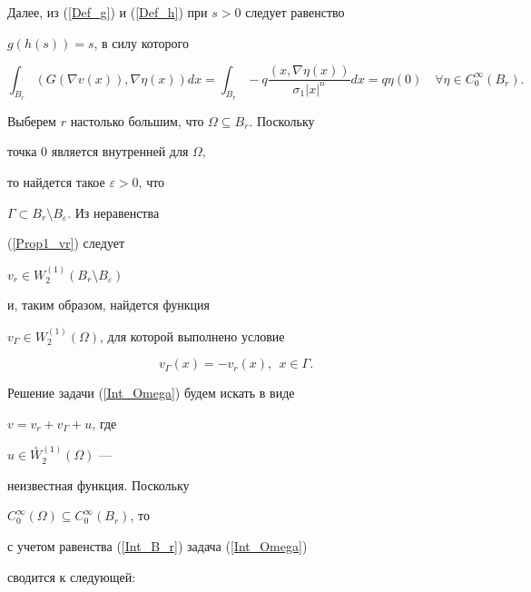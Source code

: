 Далее, из (\ref{Def_g}) и (\ref{Def_h}) при $s>0$ следует равенство


$g(h(s))=s$, в силу которого


$$


\int_{B_r } (G(\nabla v (x)), \nabla \eta (x)) dx =


\int_{B_r } -q \frac{(x, \nabla \eta (x))}{\sigma_1|x|^{n}}


dx = q \eta (0)\quad \forall \eta \in C^{\infty}_{0}(B_r).


$$





Выберем $r$ настолько большим, что $\Omega \subseteq B_r$. Поскольку 


точка $0$ является внутренней для $\Omega$,


то найдется такое $\varepsilon >0$, что


$\Gamma \subset B_r \setminus B_\varepsilon$. Из неравенства


(\ref{Prop1_vr}) следует


$v_{r} \in {W}^{(1)}_{2} (B_r \setminus B_\varepsilon)$


и, таким образом, найдется функция


$v_{\Gamma} \in {W}^{(1)}_{2} (\Omega)$, для которой выполнено условие


\begin{equation*}




v_{\Gamma}(x) = -v_{r}(x), \ \ x \in \Gamma.


\end{equation*}





Решение задачи (\ref{Int_Omega}) будем искать в виде


$v= v_{r}+v_{\Gamma}+u$, где


$u \in \overset{\circ}{W}{}^{(1)}_{2} (\Omega)$ ---


неизвестная функция. Поскольку


$C^{\infty}_{0}(\Omega) \subseteq C^{\infty}_{0}(B_r)$, то


с учетом равенства (\ref{Int_B_r}) задача (\ref{Int_Omega})


сводится к следующей:


